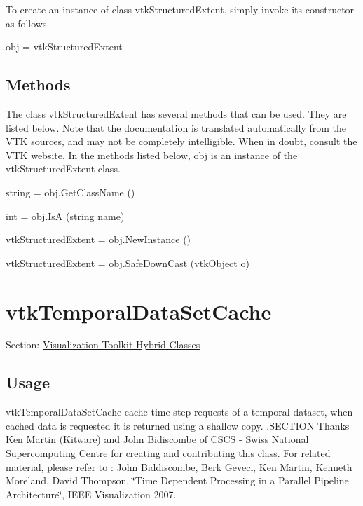 To create an instance of class vtk\-Structured\-Extent, simply invoke its constructor as follows \begin{DoxyVerb}  obj = vtkStructuredExtent
\end{DoxyVerb}
 \hypertarget{vtkwidgets_vtkxyplotwidget_Methods}{}\subsection{Methods}\label{vtkwidgets_vtkxyplotwidget_Methods}
The class vtk\-Structured\-Extent has several methods that can be used. They are listed below. Note that the documentation is translated automatically from the V\-T\-K sources, and may not be completely intelligible. When in doubt, consult the V\-T\-K website. In the methods listed below, {\ttfamily obj} is an instance of the vtk\-Structured\-Extent class. 
\begin{DoxyItemize}
\item {\ttfamily string = obj.\-Get\-Class\-Name ()}  
\item {\ttfamily int = obj.\-Is\-A (string name)}  
\item {\ttfamily vtk\-Structured\-Extent = obj.\-New\-Instance ()}  
\item {\ttfamily vtk\-Structured\-Extent = obj.\-Safe\-Down\-Cast (vtk\-Object o)}  
\end{DoxyItemize}\hypertarget{vtkhybrid_vtktemporaldatasetcache}{}\section{vtk\-Temporal\-Data\-Set\-Cache}\label{vtkhybrid_vtktemporaldatasetcache}
Section\-: \hyperlink{sec_vtkhybrid}{Visualization Toolkit Hybrid Classes} \hypertarget{vtkwidgets_vtkxyplotwidget_Usage}{}\subsection{Usage}\label{vtkwidgets_vtkxyplotwidget_Usage}
vtk\-Temporal\-Data\-Set\-Cache cache time step requests of a temporal dataset, when cached data is requested it is returned using a shallow copy. .S\-E\-C\-T\-I\-O\-N Thanks Ken Martin (Kitware) and John Bidiscombe of C\-S\-C\-S -\/ Swiss National Supercomputing Centre for creating and contributing this class. For related material, please refer to \-: John Biddiscombe, Berk Geveci, Ken Martin, Kenneth Moreland, David Thompson, \char`\"{}\-Time Dependent Processing in a Parallel Pipeline Architecture\char`\"{}, I\-E\-E\-E Visualization 2007.


